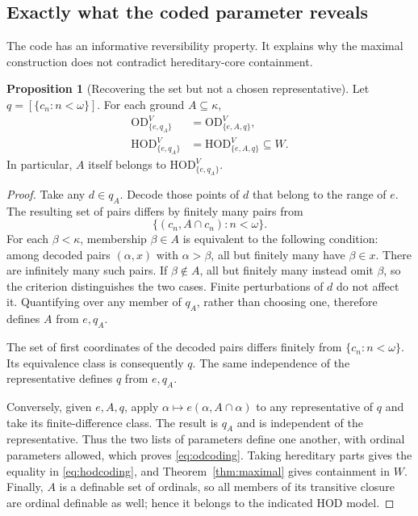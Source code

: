 \documentclass[11pt,letterpaper]{article}
\theoremstyle{definition}
\newtheorem{proposition}[definition]{Proposition}
\numberwithin{equation}{section}
\newcommand{\HOD}{\mathrm{HOD}}
\newcommand{\OD}{\mathrm{OD}}
\begin{document}
\subsection{Exactly what the coded parameter reveals}

The code has an informative reversibility property. It explains why the maximal construction does not contradict hereditary-core containment.

\begin{proposition}[Recovering the set but not a chosen representative]\label{prop:recover}
Let $q=[\{c_n:n<\omega\}]$. For each ground $A\subseteq\kappa$,
\begin{align}
\OD_{\{e,q_A\}}^V&=\OD_{\{e,A,q\}}^V,\label{eq:odcoding}\\
\HOD_{\{e,q_A\}}^V&=\HOD_{\{e,A,q\}}^V\subseteq W.\label{eq:hodcoding}
\end{align}
In particular, $A$ itself belongs to $\HOD_{\{e,q_A\}}^V$.
\end{proposition}
\begin{proof}
Take any $d\in q_A$. Decode those points of $d$ that belong to the range of $e$. The resulting set of pairs differs by finitely many pairs from
\[
\{(c_n,A\cap c_n):n<\omega\}.
\]
For each $\beta<\kappa$, membership $\beta\in A$ is equivalent to the following condition: among decoded pairs $(\alpha,x)$ with $\alpha>\beta$, all but finitely many have $\beta\in x$. There are infinitely many such pairs. If $\beta\notin A$, all but finitely many instead omit $\beta$, so the criterion distinguishes the two cases. Finite perturbations of $d$ do not affect it. Quantifying over any member of $q_A$, rather than choosing one, therefore defines $A$ from $e,q_A$.

The set of first coordinates of the decoded pairs differs finitely from $\{c_n:n<\omega\}$. Its equivalence class is consequently $q$. The same independence of the representative defines $q$ from $e,q_A$.

Conversely, given $e,A,q$, apply $\alpha\mapsto e(\alpha,A\cap\alpha)$ to any representative of $q$ and take its finite-difference class. The result is $q_A$ and is independent of the representative. Thus the two lists of parameters define one another, with ordinal parameters allowed, which proves \eqref{eq:odcoding}. Taking hereditary parts gives the equality in \eqref{eq:hodcoding}, and Theorem~\ref{thm:maximal} gives containment in $W$. Finally, $A$ is a definable set of ordinals, so all members of its transitive closure are ordinal definable as well; hence it belongs to the indicated HOD model.
\end{proof}
\end{document}
